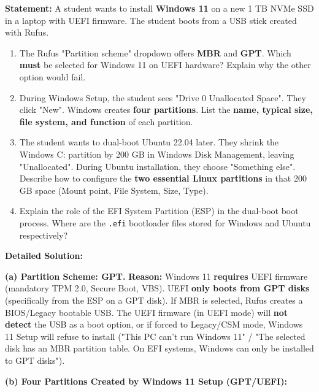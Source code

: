 \documentclass[11pt]{article}
\newcommand{\cle}[1]{{\popxbold\color{popdark}#1}}
\begin{document}
\begin{exoresolu}
\textbf{Statement:} A student wants to install \textbf{Windows 11} on a new 1 TB NVMe SSD in a laptop with UEFI firmware. The student boots from a USB stick created with Rufus.
\begin{enumerate}
    \item The Rufus "Partition scheme" dropdown offers \textbf{MBR} and \textbf{GPT}. Which \textbf{must} be selected for Windows 11 on UEFI hardware? Explain why the other option would fail.
    \item During Windows Setup, the student sees "Drive 0 Unallocated Space". They click "New". Windows creates \textbf{four partitions}. List the \textbf{name, typical size, file system, and function} of each partition.
    \item The student wants to dual-boot Ubuntu 22.04 later. They shrink the Windows C: partition by 200 GB in Windows Disk Management, leaving "Unallocated". During Ubuntu installation, they choose "Something else". Describe how to configure the \textbf{two essential Linux partitions} in that 200 GB space (Mount point, File System, Size, Type).
    \item Explain the role of the \cle{EFI System Partition (ESP)} in the dual-boot boot process. Where are the \texttt{.efi} bootloader files stored for Windows and Ubuntu respectively?
\end{enumerate}
\tcblower
\textbf{Detailed Solution:}

\noindent\textbf{(a) Partition Scheme: \cle{GPT}.}
\textbf{Reason:} Windows 11 \textbf{requires} UEFI firmware (mandatory TPM 2.0, Secure Boot, VBS). UEFI \textbf{only boots from GPT disks} (specifically from the ESP on a GPT disk). If MBR is selected, Rufus creates a BIOS/Legacy bootable USB. The UEFI firmware (in UEFI mode) will \textbf{not detect} the USB as a boot option, or if forced to Legacy/CSM mode, Windows 11 Setup will refuse to install ("This PC can't run Windows 11" / "The selected disk has an MBR partition table. On EFI systems, Windows can only be installed to GPT disks").

\noindent\textbf{(b) Four Partitions Created by Windows 11 Setup (GPT/UEFI):}


\end{exoresolu}
\end{document}
